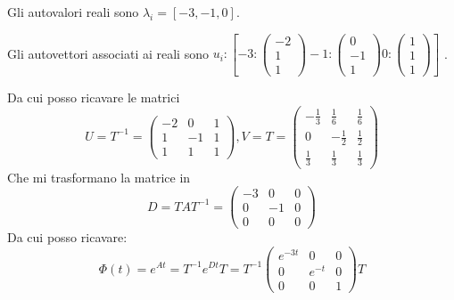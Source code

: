 \documentclass{article}
\begin{document}
Gli autovalori reali sono $\lambda_i = [-3, -1, 0]$.

Gli autovettori associati ai reali sono $ u_i: [  -3: \left(\begin{matrix}-2\\1\\1\end{matrix}\right)-1: \left(\begin{matrix}0\\-1\\1\end{matrix}\right)0: \left(\begin{matrix}1\\1\\1\end{matrix}\right) ]$
.

Da cui posso ricavare le matrici \[U=T^{-1} = \left(\begin{matrix}-2 & 0 & 1\\1 & -1 & 1\\1 & 1 & 1\end{matrix}\right), V = T = \left(\begin{matrix}- \frac{1}{3} & \frac{1}{6} & \frac{1}{6}\\0 & - \frac{1}{2} & \frac{1}{2}\\\frac{1}{3} & \frac{1}{3} & \frac{1}{3}\end{matrix}\right)\]
Che mi trasformano la matrice in \[ D = TAT^{-1} = \left(\begin{matrix}-3 & 0 & 0\\0 & -1 & 0\\0 & 0 & 0\end{matrix}\right) \]
Da cui posso ricavare: \[ \Phi(t) = e^{At} = T^{-1} e^{Dt} T =  T^{-1} \left(\begin{matrix}e^{- 3 t} & 0 & 0\\0 & e^{- t} & 0\\0 & 0 & 1\end{matrix}\right) T\]
\end{document}

